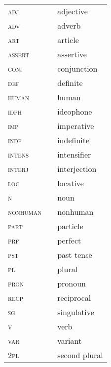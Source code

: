 \begin{tabular}{>{\scshape}lll}
adj&  & adjective\\
adv& &adverb\\
art& &article\\
assert& &assertive\\
conj& &conjunction\\
def& &definite\\
human& &human\\
idph& &ideophone\\
imp& &imperative\\
indf& &indefinite\\
intens& &intensifier\\
interj& &interjection\\
loc& &locative\\
n& &noun\\
nonhuman& &nonhuman\\
part& &particle\\
prf& &perfect\\
pst& &past tense\\
pl& &plural\\
pron& &pronoun\\
recp& &reciprocal\\
sg& & singulative\\
v& &verb\\
var& &variant\\
2pl& &second plural\\
\end{tabular}
